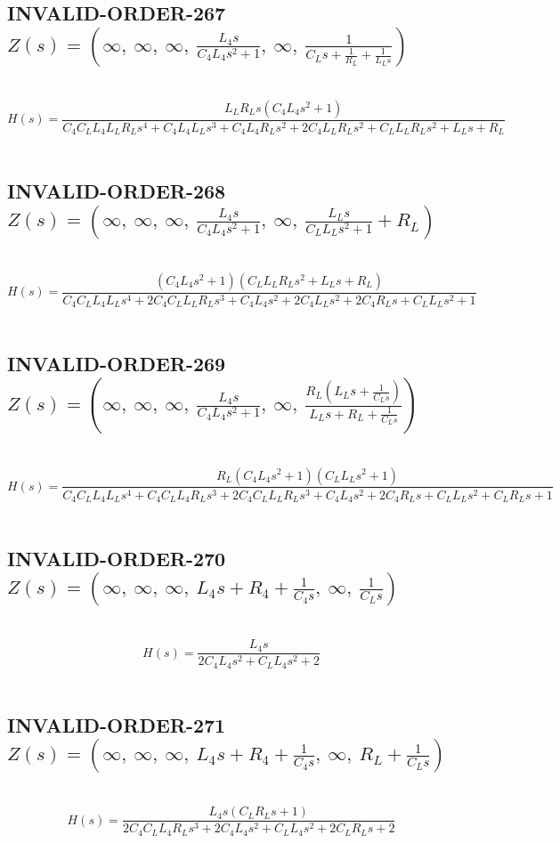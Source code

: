\documentclass{article}
\begin{document}
\subsection{INVALID-ORDER-267 $Z(s) = \left( \infty, \  \infty, \  \infty, \  \frac{L_{4} s}{C_{4} L_{4} s^{2} + 1}, \  \infty, \  \frac{1}{C_{L} s + \frac{1}{R_{L}} + \frac{1}{L_{L} s}}\right)$ } \ 
\textbf{\[H(s) = \frac{L_{L} R_{L} s \left(C_{4} L_{4} s^{2} + 1\right)}{C_{4} C_{L} L_{4} L_{L} R_{L} s^{4} + C_{4} L_{4} L_{L} s^{3} + C_{4} L_{4} R_{L} s^{2} + 2 C_{4} L_{L} R_{L} s^{2} + C_{L} L_{L} R_{L} s^{2} + L_{L} s + R_{L}}\] } \ 
\subsection{INVALID-ORDER-268 $Z(s) = \left( \infty, \  \infty, \  \infty, \  \frac{L_{4} s}{C_{4} L_{4} s^{2} + 1}, \  \infty, \  \frac{L_{L} s}{C_{L} L_{L} s^{2} + 1} + R_{L}\right)$ } \ 
\textbf{\[H(s) = \frac{\left(C_{4} L_{4} s^{2} + 1\right) \left(C_{L} L_{L} R_{L} s^{2} + L_{L} s + R_{L}\right)}{C_{4} C_{L} L_{4} L_{L} s^{4} + 2 C_{4} C_{L} L_{L} R_{L} s^{3} + C_{4} L_{4} s^{2} + 2 C_{4} L_{L} s^{2} + 2 C_{4} R_{L} s + C_{L} L_{L} s^{2} + 1}\] } \ 
\subsection{INVALID-ORDER-269 $Z(s) = \left( \infty, \  \infty, \  \infty, \  \frac{L_{4} s}{C_{4} L_{4} s^{2} + 1}, \  \infty, \  \frac{R_{L} \left(L_{L} s + \frac{1}{C_{L} s}\right)}{L_{L} s + R_{L} + \frac{1}{C_{L} s}}\right)$ } \ 
\textbf{\[H(s) = \frac{R_{L} \left(C_{4} L_{4} s^{2} + 1\right) \left(C_{L} L_{L} s^{2} + 1\right)}{C_{4} C_{L} L_{4} L_{L} s^{4} + C_{4} C_{L} L_{4} R_{L} s^{3} + 2 C_{4} C_{L} L_{L} R_{L} s^{3} + C_{4} L_{4} s^{2} + 2 C_{4} R_{L} s + C_{L} L_{L} s^{2} + C_{L} R_{L} s + 1}\] } \ 
\subsection{INVALID-ORDER-270 $Z(s) = \left( \infty, \  \infty, \  \infty, \  L_{4} s + R_{4} + \frac{1}{C_{4} s}, \  \infty, \  \frac{1}{C_{L} s}\right)$ } \ 
\textbf{\[H(s) = \frac{L_{4} s}{2 C_{4} L_{4} s^{2} + C_{L} L_{4} s^{2} + 2}\] } \ 
\subsection{INVALID-ORDER-271 $Z(s) = \left( \infty, \  \infty, \  \infty, \  L_{4} s + R_{4} + \frac{1}{C_{4} s}, \  \infty, \  R_{L} + \frac{1}{C_{L} s}\right)$ } \ 
\textbf{\[H(s) = \frac{L_{4} s \left(C_{L} R_{L} s + 1\right)}{2 C_{4} C_{L} L_{4} R_{L} s^{3} + 2 C_{4} L_{4} s^{2} + C_{L} L_{4} s^{2} + 2 C_{L} R_{L} s + 2}\] } \ 
\end{document}
